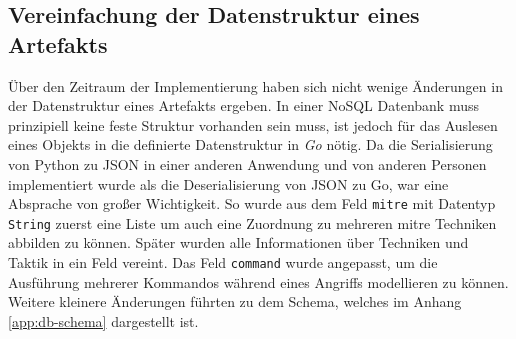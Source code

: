 \subsection{Vereinfachung der Datenstruktur eines Artefakts}
Über den Zeitraum der Implementierung haben sich nicht wenige Änderungen in der Datenstruktur eines Artefakts ergeben. In einer NoSQL Datenbank muss prinzipiell keine feste Struktur vorhanden sein muss, ist jedoch für das Auslesen eines Objekts in die definierte Datenstruktur in \textit{Go} nötig. Da die Serialisierung von Python zu JSON in einer anderen Anwendung und von anderen Personen implementiert wurde als die Deserialisierung von JSON zu Go, war eine Absprache von großer Wichtigkeit. So wurde aus dem Feld \verb|mitre| mit Datentyp \verb|String| zuerst eine Liste um auch eine Zuordnung zu mehreren \gls{mitre} Techniken abbilden zu können. Später wurden alle Informationen über Techniken und Taktik in ein Feld vereint. Das Feld \verb|command| wurde angepasst, um die Ausführung mehrerer Kommandos während eines Angriffs modellieren zu können. Weitere kleinere Änderungen führten zu dem Schema, welches im Anhang \ref{app:db-schema} dargestellt ist.